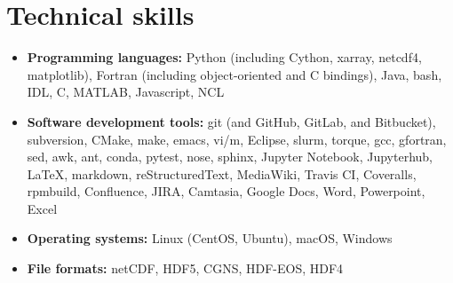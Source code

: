 \section{Technical skills}
\vspace{0.5em}

\begin{itemize}

  \item \textbf{Programming languages:} Python
    (including Cython, xarray, netcdf4, matplotlib), Fortran
    (including object-oriented and C bindings), Java, bash, IDL, C,
    MATLAB, Javascript, NCL

  \item \textbf{Software development tools:} git (and GitHub, GitLab,
    and Bitbucket), subversion, CMake, make, emacs, vi/m, Eclipse,
    slurm, torque, gcc, gfortran, sed, awk, ant, conda, pytest, nose,
    sphinx, Jupyter Notebook, Jupyterhub, \LaTeX, markdown,
    reStructuredText, MediaWiki, {Travis CI}, Coveralls, rpmbuild,
    Confluence, JIRA, Camtasia, Google Docs, Word, Powerpoint, Excel

  \item \textbf{Operating systems:} Linux (CentOS, Ubuntu), macOS,
    Windows

  \item \textbf{File formats:} netCDF, HDF5, CGNS, HDF-EOS, HDF4

\end{itemize}

